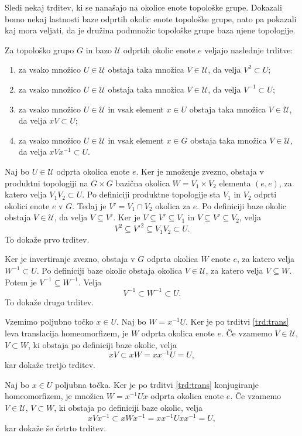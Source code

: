 \documentclass[mat1]{fmfdelo}
\newcommand{\Ucurl}{\mathcal{U}}
\begin{document}
Sledi nekaj trditev, ki se nanašajo na okolice enote topološke grupe. Dokazali bomo nekaj lastnosti baze odprtih okolic enote topološke grupe, nato pa pokazali kaj mora veljati, da je družina podmnožic topološke grupe baza njene topologije.

\begin{trditev}\label{trd:okolice}
Za topološko grupo $G$ in bazo $\Ucurl$ odprtih okolic enote $e$ veljajo naslednje trditve:
\begin{enumerate}
\item za vsako množico $U \in \Ucurl$ obstaja taka množica $V \in \Ucurl$, da velja $V^{2} \subset U$;\label{last:oko1}
\item za vsako množico $U \in \Ucurl$ obstaja taka množica $V \in \Ucurl$, da velja $V^{-1} \subset U$;\label{last:oko2}
\item za vsako množico $U \in \Ucurl$ in vsak element $x \in U$ obstaja taka množica $V \in \Ucurl$, da velja $xV \subset U$; \label{last:oko3}
\item za vsako množico $U \in \Ucurl$ in vsak element $x \in G$ obstaja taka množica $V \in \Ucurl$, da velja $xVx^{-1} \subset U$.\label{last:oko4}
\end{enumerate}
\end{trditev}

\begin{dokaz}
Naj bo $U \in \Ucurl$  odprta okolica enote $e$. Ker je množenje zvezno, obstaja v produktni topologiji na $G \times G$ bazična okolica $W = V_1 \times V_2$ elementa $(e, e)$, za katero velja $V_1V_2 \subset U$. Po definiciji produktne topologije sta $V_1$ in $V_2$ odprti okolici enote $e$ v $G$. Tedaj je $V' = V_1 \cap V_2$ okolica za $e$. Po definiciji baze okolic obstaja $V \in \Ucurl$, da velja $V \subseteq V'$. Ker je $V \subseteq V' \subseteq V_1$ in $V \subseteq V' \subseteq V_2$, velja \[V^2 \subseteq V'^2 \subseteq V_1V_2 \subset U.\] To dokaže prvo trditev.

Ker je invertiranje zvezno, obstaja v $G$ odprta okolica $W$ enote $e$, za katero velja $W^{-1} \subset U$. Po definiciji baze okolic obstaja okolica $V \in \Ucurl$, za katero velja $V \subseteq W$. Potem je $V^{-1} \subseteq W^{-1}$. Velja \[V^{-1} \subset W^{-1} \subset U.\] To dokaže drugo trditev.

Vzemimo poljubno točko $x \in U$. Naj bo $W = x^{-1}U$. Ker je po trditvi \ref{trd:trans} leva translacija homeomorfizem, je $W$ odprta okolica enote $e$. Če vzamemo $V \in \Ucurl$, $V \subset W$, ki obstaja po definiciji baze okolic, velja \[xV \subset xW = xx^{-1}U = U,\]
kar dokaže tretjo trditev.

Naj bo $x \in U$ poljubna točka. Ker je po trditvi \ref{trd:trans} konjugiranje homeomorfizem, je množica $W = x^{-1}Ux$ odprta okolica enote $e$. Če vzamemo $V \in \Ucurl$, $V \subset W$, ki obstaja po definiciji baze okolic, velja
\[ xVx^{-1} \subset xWx^{-1} = xx^{-1}Uxx^{-1} = U, \]
kar dokaže še četrto trditev.
\end{dokaz}
\end{document}
